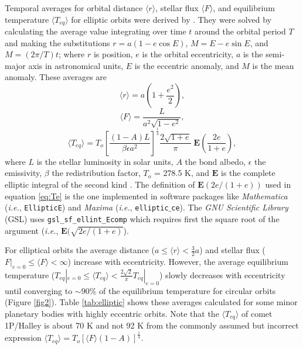 \documentclass[a4paper,fleqn,usenatbib]{mnras}
\begin{document}
Temporal averages for orbital distance $\langle r \rangle$, stellar flux $\langle F \rangle$, and equilibrium temperature $\langle T_{eq} \rangle$ for elliptic orbits were derived by \citet{2017ApJ...837L...1M}. They were solved by calculating the average value integrating over time $t$ around the orbital period $T$ and making the substitutions $r=a(1-e\cos{E})$, $M=E-e\sin{E}$, and $M=(2\pi/T)t$; where $r$ is position, $e$ is the orbital eccentricity, $a$ is the semi-major axis in astronomical units, $E$ is the eccentric anomaly, and $M$ is the mean anomaly. These averages are
\begin{equation} \label{eq:re}
\langle r \rangle = a\left ( 1+\frac{e^2}{2} \right ),
\end{equation}
\begin{equation} \label{eq:Fe}
\langle F \rangle = \frac{L}{a^2\sqrt{1-e^2}},
\end{equation}
\begin{equation} \label{eq:Te}
\langle T_{eq} \rangle = T_o\left[ \frac{(1-A)L}{\beta \epsilon a^2}\right] ^\frac{1}{4}\frac{2\sqrt{1+e}}{\pi} \; \mathbf{E}\left ( \frac{2e}{1+e} \right ),
\end{equation}
where $L$ is the stellar luminosity in solar units, $A$ the bond albedo, $\epsilon$ the emissivity, $\beta$ the redistribution factor, $T_o$ = 278.5 K, and $\mathbf{E}$ is the complete elliptic integral of the second kind \citep{MathWorld, GSL}. The definition of $\mathbf{E}(2e/(1+e))$ used in equation \ref{eq:Te} is the one implemented in software packages like \emph{Mathematica} (\emph{i.e.}, \texttt{EllipticE}) and \emph{Maxima} (\emph{i.e.}, \texttt{elliptic$\_$ce}). The \emph{GNU Scientific Library} (GSL) uses \texttt{gsl\_sf\_ellint\_Ecomp} which requires first the square root of the argument (\emph{i.e.}, $\mathbf{E}(\sqrt{2e/(1+e)}$).

For elliptical orbits the average distance ($a \leq \langle r \rangle < \frac{3}{2}a$) and stellar flux ($F|_{e=0} \leq \langle F \rangle < \infty$) increase with eccentricity. However, the average equilibrium temperature ($T_{eq}|_{e=0} \leq \langle T_{eq} \rangle < \frac{2\sqrt{2}}{\pi} T_{eq}|_{e=0}$) slowly decreases with eccentricity until converging to $\sim90\%$ of the equilibrium temperature for circular orbits (Figure  \ref{fig2}). Table \ref{tab:elliptic} shows these averages calculated for some minor planetary bodies with highly eccentric orbits. Note that the $\langle T_{eq} \rangle$ of comet 1P/Halley is about 70 K and not 92 K from the commonly assumed but incorrect expression $\langle T_{eq} \rangle = T_o [\langle F \rangle(1-A)]^\frac{1}{4}$.
\end{document}
